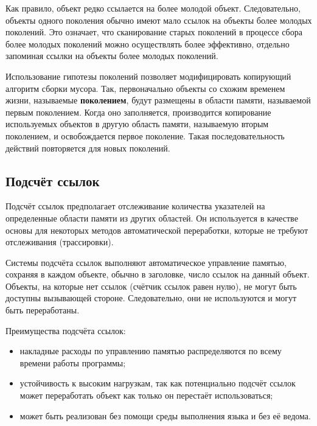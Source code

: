 Как правило, объект редко ссылается на более молодой объект. Следовательно, объекты одного поколения обычно имеют мало ссылок на объекты более молодых поколений. Это означает, что сканирование старых поколений в процессе сбора более молодых поколений можно осуществлять более эффективно, отдельно запоминая ссылки на объекты более молодых поколений. \cite{cornell3}


Использование гипотезы поколений позволяет модифицировать копирующий алгоритм сборки мусора. Так, первоначально объекты со схожим временем жизни, называемые \textbf{поколением}, будут размещены в области памяти, называемой первым поколением. Когда оно заполняется, производится копирование используемых объектов в другую область памяти, называемую вторым поколением, и освобождается первое поколение. Такая последовательность действий повторяется для новых поколений. \cite{cornell3}



\subsection{Подсчёт ссылок}

Подсчёт ссылок предполагает отслеживание количества указателей на определенные области памяти из других областей. Он используется в качестве основы для некоторых методов автоматической переработки, которые не требуют отслеживания (трассировки). \cite{recycling}

Системы подсчёта ссылок выполняют автоматическое управление памятью, сохраняя в каждом объекте, обычно в заголовке, число ссылок на данный объект. Объекты, на которые нет ссылок (счётчик ссылок равен нулю), не могут быть доступны вызывающей стороне. Следовательно, они не используются и могут быть переработаны. \cite{glossary}

Преимущества подсчёта ссылок:

\begin{itemize}[label*=---]
	\item накладные расходы по управлению памятью распределяются по всему времени работы программы; \cite{handbook}
	\item устойчивость к высоким нагрузкам, так как потенциально подсчёт ссылок может переработать объект как только он перестаёт использоваться; \cite{handbook}
	\item может быть реализован без помощи среды выполнения языка и без её ведома. \cite{handbook}
\end{itemize}

